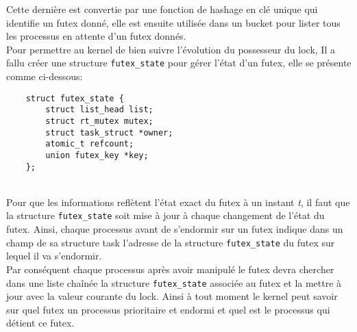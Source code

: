 Cette dernière est convertie par une fonction de hashage en clé unique qui 
identifie un futex donné, elle est ensuite utilisée dans un bucket pour lister
tous les processus en attente d'un futex donnés.
\\

Pour permettre au kernel de bien suivre l'évolution du possesseur du lock, Il a
fallu créer une structure \verb|futex_state| pour gérer l'état d'un futex, elle se
présente comme ci-dessous:
\begin{lstlisting}
	struct futex_state {
		struct list_head list;
		struct rt_mutex mutex;
		struct task_struct *owner;
		atomic_t refcount;
		union futex_key *key;
	};

\end{lstlisting}
\\

Pour que les informations reflètent l'état exact du futex
à un instant \textit{t}, il faut que la structure \verb|futex_state| soit mise à jour
à chaque changement de l'état du futex. Ainsi, chaque processus avant de 
s'endormir sur un futex indique dans un champ de sa structure task l'adresse de 
la structure \verb|futex_state| du futex sur lequel il va s'endormir.
\\

Par conséquent chaque processus après avoir manipulé le futex 
devra chercher dans une liste chaînée la structure \verb|futex_state| associée au 
futex et la mettre à jour avec la valeur courante du lock. Ainsi à tout moment le kernel peut savoir sur quel futex un processus prioritaire et endormi 
et quel est le processus qui détient ce futex.